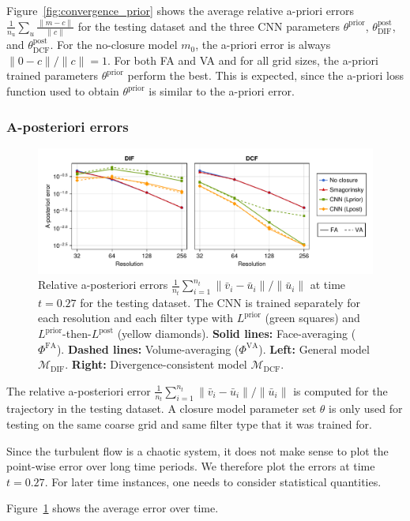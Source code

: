 \documentclass[preprint]{elsarticle}
\newcommand{\revboth}[1]{#1}
\begin{document}
Figure~\ref{fig:convergence_prior} shows the average relative a-priori errors
$\frac{1}{n_\text{u}} \sum_u \frac{\| m - c \|}{\| c \|}$
for the testing dataset and the three CNN
parameters $\theta^\text{prior}$, $\theta^\text{post}_\text{DIF}$,
and $\theta^\text{post}_\text{DCF}$. For the no-closure model $m_0$, the a-priori
error is always $\| 0 - c \| / \| c \| = 1$. For both FA and VA and for all grid
sizes, the a-priori trained parameters $\theta^\text{prior}$ perform the best.
This is expected, since the a-priori loss function used to obtain
$\theta^\text{prior}$ is similar to the a-priori error.

\subsubsection{A-posteriori errors}

\begin{figure}
    \centering
    \includegraphics[width=\textwidth]{figures_kolmogorov_epost.pdf}
    \caption{
        \revboth{Relative} a-posteriori errors
        $\frac{1}{n_t} \sum_{i = 1}^{n_t} \| \bar{v}_i - \bar{u}_i \| / \| \bar{u}_i \|$
        \revboth{at time $t = 0.27$}
        for the testing dataset. The CNN is
        trained separately for each resolution and each filter type with
        $L^\text{prior}$ (green squares) and
        $L^\text{prior}$-then-$L^\text{post}$ (yellow diamonds). \textbf{Solid
        lines:} Face-averaging ($\Phi^\text{FA}$). \textbf{Dashed lines:}
        Volume-averaging ($\Phi^\text{VA}$). \textbf{Left:} General model
        $\mathcal{M}_{\text{DIF}}$. \textbf{Right:} Divergence-consistent model
        $\mathcal{M}_{\text{DCF}}$.
    }
    \label{fig:convergence}
\end{figure}

The relative a-posteriori error
$\frac{1}{n_t} \sum_{i = 1}^{n_t} \| \bar{v}_i - \bar{u}_i \| / \| \bar{u}_i \|$
is computed for the trajectory in the testing dataset.
A \revboth{ closure model} parameter set $\theta$ is only used
for testing on the same coarse grid and same filter type that it was trained
for.
\revboth{
    Since the turbulent flow is a chaotic system, it does not make sense to plot
    the point-wise error over long time periods. We therefore plot the errors at
    time $t = 0.27$. For later time instances, one needs to consider statistical quantities.
}
Figure~\ref{fig:convergence} shows the average error over time.
\end{document}
